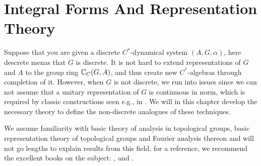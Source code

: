 \chapter{Integral Forms And Representation Theory}
Suppose that you are given a discrete $C^*$-dynamical system $(A,G,\alpha)$, here descrete menas that $G$ is discrete. It is not hard to extend representations of $G$ and $A$ to the group ring $\mathbb{C}_C(G,A)$, and thus create new $C^*$-algebras through completion of it. However, when $G$ is not discrete, we run into issues since we can not assume that a unitary representation of $G$ is continuous in norm, which is required by classic constructions seen e.g., in \cite{brown2008c}. We will in this chapter develop the necessary theory to define the non-discrete analogues of these techniques.

We assume familiarity with basic theory of analysis in topological groups, basic representation theory of topological groups and Fourier analysis thereon and will not go lengths to explain results from this field, for a reference, we recommend the excellent books on the subject: \cite{folland2016fourier}, \cite{berg1984harmonic} and \cite{folland2013real}.


